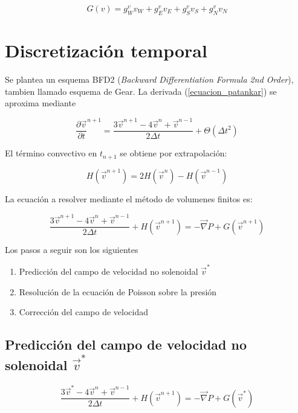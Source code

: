 \begin{equation}
G(v) = g_W^v v_W + g_E^v v_E + g_S^v v_S + g_N^v v_N
\end{equation}

\section{Discretización temporal}

Se plantea un esquema BFD2 (\textit{Backward Differentiation Formula 2nd Order}), tambien llamado esquema de Gear. La derivada (\ref{ecuacion_patankar}) se aproxima mediante

\begin{equation}
\dfrac{\partial \vec{v}}{\partial t} ^ {n+1} = \dfrac{3 \vec{v}^{n+1} -4\vec{v}^n + \vec{v}^{n-1}}{2 \Delta t} + \Theta(\Delta t^2) 
\end{equation}

El término convectivo en $t_{n+1}$ se obtiene por extrapolación:

\begin{equation}
H(\vec{v}^{n+1}) = 2 H(\vec{v}^n) - H(\vec{v}^{n-1})
\end{equation}

La ecuación a resolver mediante el método de volumenes finitos es:

\begin{equation} \label{ecuación_gobernante}
\dfrac{3 \vec{v}^{n+1} -4\vec{v}^n + \vec{v}^{n-1}}{2 \Delta t} + H(\vec{v}^{n+1}) = -\vec{\nabla} P + G(\vec{v}^{n+1})
\end{equation}

Los pasos a seguir son los siguientes
\begin{enumerate}
\item Predicción del campo de velocidad no solenoidal $\vec{v}^*$
\item Resolución de la ecuación de Poisson sobre la presión
\item Corrección del campo de velocidad
\end{enumerate}

\subsection{Predicción del campo de velocidad no solenoidal $\vec{v}^*$}

\begin{equation}
\dfrac{3 \vec{v}^{*} -4\vec{v}^n + \vec{v}^{n-1}}{2 \Delta t} + H(\vec{v}^{n+1}) = -\vec{\nabla} P + G(\vec{v}^{*})
\end{equation}

